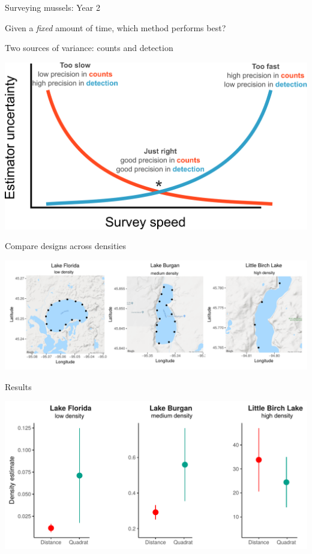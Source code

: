 \documentclass[ignorenonframetext,]{beamer}
\begin{document}
\begin{frame}{Surveying mussels: Year 2}
\begin{block}{Given a \emph{fixed} amount of time, which method performs
best?}
\end{block}

\begin{block}{Two sources of variance: counts and detection}

\begin{center}\includegraphics[width=0.7\linewidth]{../Figures/PrecisionTradeoffs} \end{center}

\end{block}

\begin{block}{Compare designs across densities}

\begin{center}\includegraphics[width=0.95\linewidth]{../Figures/Season2Lakes} \end{center}

\end{block}

\begin{block}{Results}

\begin{center}\includegraphics[width=0.9\linewidth]{../Figures/DensityEstimate2} \end{center}


\end{block}
\end{frame}
\end{document}
